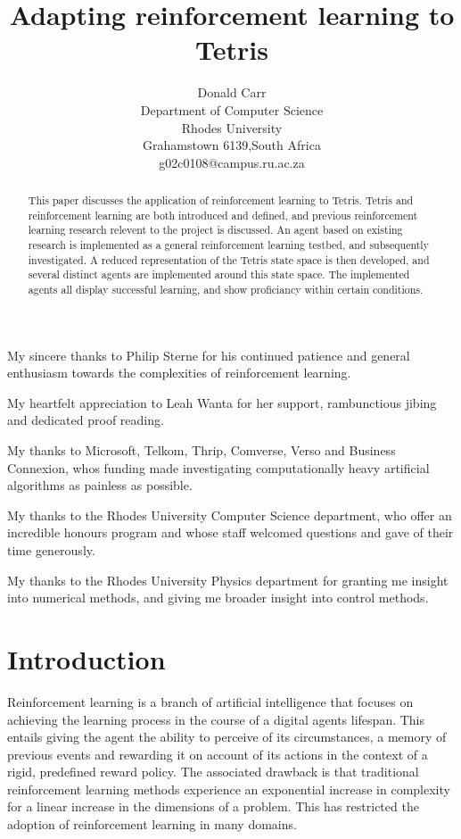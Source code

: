 \documentclass{rucsthesis}
\title{Adapting reinforcement learning to Tetris}
\author{Donald Carr \\ Department of Computer Science \\ Rhodes University \\ Grahamstown 6139,South Africa \\ g02c0108@campus.ru.ac.za}
\begin{document}
\maketitle

\begin{abstract}

This paper discusses the application of reinforcement learning to Tetris. Tetris and reinforcement learning are both introduced and defined, and previous reinforcement learning research relevent to the project is discussed. An agent based on existing research is implemented as a general reinforcement learning testbed, and subsequently investigated. A reduced representation of the Tetris state space is then developed, and several distinct agents are implemented around this state space. The implemented agents all display successful learning, and show proficiancy within certain conditions. 

\end{abstract}

\begin{acknowledgements}

My sincere thanks to Philip Sterne for his continued patience and general enthusiasm towards the complexities of reinforcement learning.

My heartfelt appreciation to Leah Wanta for her support, rambunctious jibing and dedicated proof reading. 

My thanks to Microsoft, Telkom, Thrip, Comverse, Verso and Business Connexion, whos funding made investigating computationally heavy artificial algorithms as painless as possible.

My thanks to the Rhodes University Computer Science department, who offer an incredible honours program and whose staff welcomed questions and gave of their time generously.

My thanks to the Rhodes University Physics department for granting me insight into numerical methods, and giving me broader insight into control methods.

\end{acknowledgements}




\tableofcontents
\pagebreak
\listoffigures
\pagebreak
\listoftables
\pagebreak

\chapter{Introduction}

Reinforcement learning is a branch of artificial intelligence that focuses on achieving the learning process in the course of a digital agents lifespan. This entails giving the agent the ability to perceive of its circumstances, a memory of previous events and rewarding it on account of its actions in the context of a rigid, predefined reward policy. The associated drawback is that traditional reinforcement learning methods experience an exponential increase in complexity for a linear increase in the dimensions of a problem. This has restricted the adoption of reinforcement learning in many domains.
\end{document}
